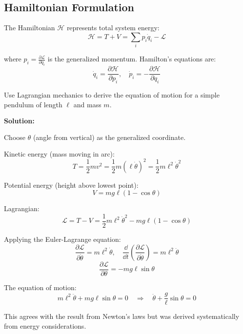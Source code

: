 \subsection{Hamiltonian Formulation}

The Hamiltonian $\mathcal{H}$ represents total system energy:
\begin{equation}
\mathcal{H} = T + V = \sum_i p_i \dot{q}_i - \mathcal{L}
\label{eq:hamiltonian}
\end{equation}

where $p_i = \frac{\partial \mathcal{L}}{\partial \dot{q}_i}$ is the generalized momentum. Hamilton's equations are:
\begin{equation}
\dot{q}_i = \frac{\partial \mathcal{H}}{\partial p_i}, \quad \dot{p}_i = -\frac{\partial \mathcal{H}}{\partial q_i}
\label{eq:hamilton_equations}
\end{equation}

\begin{examplebox}[title=Example 3.6: Lagrangian Derivation of Pendulum Equation]
Use Lagrangian mechanics to derive the equation of motion for a simple pendulum of length $\ell$ and mass $m$.

\textbf{Solution:}

Choose $\theta$ (angle from vertical) as the generalized coordinate.

Kinetic energy (mass moving in arc):
\begin{equation*}
T = \frac{1}{2}m v^2 = \frac{1}{2}m(\ell\dot{\theta})^2 = \frac{1}{2}m\ell^2\dot{\theta}^2
\end{equation*}

Potential energy (height above lowest point):
\begin{equation*}
V = mg\ell(1 - \cos\theta)
\end{equation*}

Lagrangian:
\begin{equation*}
\mathcal{L} = T - V = \frac{1}{2}m\ell^2\dot{\theta}^2 - mg\ell(1 - \cos\theta)
\end{equation*}

Applying the Euler-Lagrange equation:
\begin{equation*}
\frac{\partial \mathcal{L}}{\partial \dot{\theta}} = m\ell^2\dot{\theta}, \quad \frac{\dd}{\dd t}\left(\frac{\partial \mathcal{L}}{\partial \dot{\theta}}\right) = m\ell^2\ddot{\theta}
\end{equation*}
\begin{equation*}
\frac{\partial \mathcal{L}}{\partial \theta} = -mg\ell\sin\theta
\end{equation*}

The equation of motion:
\begin{equation*}
m\ell^2\ddot{\theta} + mg\ell\sin\theta = 0 \quad \Rightarrow \quad \boxed{\ddot{\theta} + \frac{g}{\ell}\sin\theta = 0}
\end{equation*}

This agrees with the result from Newton's laws but was derived systematically from energy considerations.
\end{examplebox}

